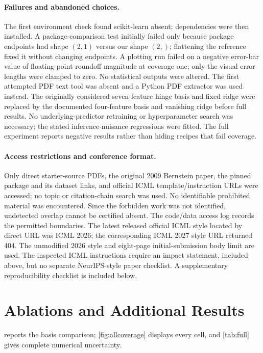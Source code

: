 \documentclass{article}
\begin{document}
\paragraph{Failures and abandoned choices.}
The first environment check found scikit-learn absent; dependencies were then installed. A package-comparison test initially failed only because package endpoints had shape $(2,1)$ versus our shape $(2,)$; flattening the reference fixed it without changing endpoints. A plotting run failed on a negative error-bar value of floating-point roundoff magnitude at coverage one; only the visual error lengths were clamped to zero. No statistical outputs were altered. The first attempted PDF text tool was absent and a Python PDF extractor was used instead. The originally considered seven-feature hinge basis and fixed ridge were replaced by the documented four-feature basis and vanishing ridge before full results. No underlying-predictor retraining or hyperparameter search was necessary; the stated inference-nuisance regressions were fitted. The full experiment reports negative results rather than hiding recipes that fail coverage.

\paragraph{Access restrictions and conference format.}
Only direct starter-source PDFs, the original 2009 Bernstein paper, the pinned package and its dataset links, and official ICML template/instruction URLs were accessed; no topic or citation-chain search was used. No identifiable prohibited material was encountered. Since the forbidden work was not identified, undetected overlap cannot be certified absent. The code/data access log records the permitted boundaries. The latest released official ICML style located by direct URL was ICML 2026; the corresponding ICML 2027 style URL returned 404. The unmodified 2026 style and eight-page initial-submission body limit are used. The inspected ICML instructions require an impact statement, included above, but no separate NeurIPS-style paper checklist. A supplementary reproducibility checklist is included below.

\section{Ablations and Additional Results}\label{app:ablations}
 reports the basis comparison; \cref{fig:allcoverage} displays every cell, and \cref{tab:full} gives complete numerical uncertainty.
\begin{table}[h]
\centering\small
\caption{Fixed-basis ablations at $n=500,N=5000$, 2000 paired repetitions. Ratios reference unrestricted PPI++; smaller width is preferable subject to coverage targeting 0.95. All recipes here are normal-based, with asymptotic assumptions for the cross-fit variants. In-sample residual fitting is an unsafe negative control, not an exact-valid baseline.}
\label{tab:ablation}

\end{table}
\end{document}
